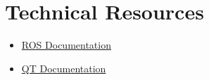 \section{Technical Resources}
\begin{itemize}
\item \href{http://wiki.ros.org/}{ROS Documentation}
\item \href{http://doc.qt.io/}{QT Documentation}
\end{itemize}